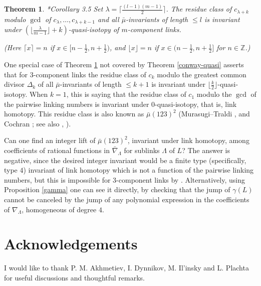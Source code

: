\documentclass[a4paper,12pt,reqno,oneside]{amsart} %
\theoremstyle{plain}
\newtheorem{theorem}{Theorem}[section]
\theoremstyle{definition}
\theoremstyle{named}
\renewcommand{\:}{\colon}
\def\Z{\mathbb{Z}}
\begin{document}
\begin{theorem} \label{conway-mu} \cite{MR2}*{Corollary 3.5}
Set $\lambda=\lceil\frac{(l-1)(m-1)}2\rceil$.
The residue class of $c_{\lambda+k}$ modulo $\gcd$ of $c_\lambda,\dots,c_{\lambda+k-1}$ 
and all $\bar\mu$-invariants of length $\le l$ is invariant under
$(\lfloor\frac\lambda{m-1}\rfloor+k)$-quasi-isotopy of $m$-component links.

(Here $\lceil x\rceil=n$ if $x\in [n-\frac12,n+\frac12)$, and
$\lfloor x\rfloor=n$ if $x\in (n-\frac12,n+\frac12]$ for $n\in\Z$.)
\end{theorem}

One special case of Theorem \ref{conway-mu} not covered by Theorem \ref{conway-quasi} asserts that for $3$-component
links the residue class of $c_k$ modulo the greatest common divisor $\Delta_k$ of all $\bar\mu$-invariants of length 
$\le k+1$ is invariant under $\lfloor\frac k2\rfloor$-quasi-isotopy.
When $k=1$, this is saying that the residue class of $c_1$ modulo the $\gcd$ of the pairwise linking numbers
is invariant under $0$-quasi-isotopy, that is, link homotopy.
This residue class is also known as $\bar\mu(123)^2$ (Murasugi--Traldi \cite{Ms}, \cite{Tr1} and Cochran \cite{Co2};
see also \cite{Le}, \cite{Masb}).

Can one find an integer lift of $\bar\mu(123)^2$, invariant under link homotopy, among coefficients of rational functions
in $\bar\nabla_\Lambda$ for sublinks $\Lambda$ of $L$?
The answer is negative, since the desired integer invariant would be a finite type (specifically, type $4$) invariant 
of link homotopy which is not a function of the pairwise linking numbers, but this is impossible for $3$-component 
links by \cite{MT}.
Alternatively, using Proposition \ref{gamma} one can see it directly, by checking that the jump of $\gamma(L)$ 
cannot be canceled by the jump of any polynomial expression in the coefficients of $\nabla_\Lambda$, 
homogeneous of degree $4$.


\section*{Acknowledgements}

I would like to thank P. M. Akhmetiev, I. Dynnikov, M. Il'insky and L. Plachta for useful discussions and thoughtful remarks. 


\end{document}
